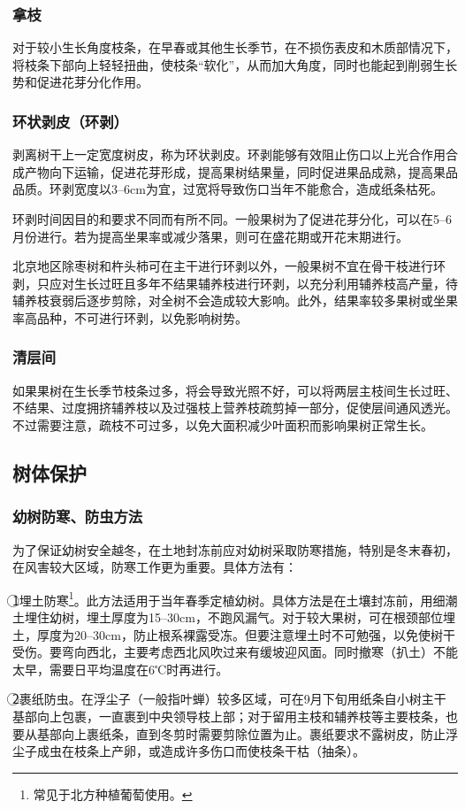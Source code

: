 \documentclass{ctexbook}
\begin{document}
\subsubsection{拿枝}
对于较小生长角度枝条，在早春或其他生长季节，在不损伤表皮和木质部情况下，将枝条下部向上轻轻扭曲，使枝条“软化”，从而加大角度，同时也能起到削弱生长势和促进花芽分化作用。
\subsubsection{环状剥皮（环剥）}
剥离树干上一定宽度树皮，称为环状剥皮。环剥能够有效阻止伤口以上光合作用合成产物向下运输，促进花芽形成，提高果树结果量，同时促进果品成熟，提高果品品质。环剥宽度以3--6cm为宜，过宽将导致伤口当年不能愈合，造成纸条枯死。

环剥时间因目的和要求不同而有所不同。一般果树为了促进花芽分化，可以在5--6月份进行。若为提高坐果率或减少落果，则可在盛花期或开花末期进行。

北京地区除枣树和杵头柿可在主干进行环剥以外，一般果树不宜在骨干枝进行环剥，只应对生长过旺且多年不结果辅养枝进行环剥，以充分利用辅养枝高产量，待辅养枝衰弱后逐步剪除，对全树不会造成较大影响。此外，结果率较多果树或坐果率高品种，不可进行环剥，以免影响树势。
\subsubsection{清层间}
如果果树在生长季节枝条过多，将会导致光照不好，可以将两层主枝间生长过旺、不结果、过度拥挤辅养枝以及过强枝上营养枝疏剪掉一部分，促使层间通风透光。不过需要注意，疏枝不可过多，以免大面积减少叶面积而影响果树正常生长。
\subsection{树体保护}
\subsubsection{幼树防寒、防虫方法}
为了保证幼树安全越冬，在土地封冻前应对幼树采取防寒措施，特别是冬末春初，在风害较大区域，防寒工作更为重要。具体方法有：

\textcircled{1}埋土防寒\footnote{常见于北方种植葡萄使用。}。此方法适用于当年春季定植幼树。具体方法是在土壤封冻前，用细潮土埋住幼树，埋土厚度为15--30cm，不跑风漏气。对于较大果树，可在根颈部位埋土，厚度为20--30cm，防止根系裸露受冻。但要注意埋土时不可勉强，以免使树干受伤。要弯向西北，主要考虑西北风吹过来有缓坡迎风面。同时撤寒（扒土）不能太早，需要日平均温度在6℃时再进行。

\textcircled{2}裹纸防虫。在浮尘子（一般指叶蝉）较多区域，可在9月下旬用纸条自小树主干基部向上包裹，一直裹到中央领导枝上部；对于留用主枝和辅养枝等主要枝条，也要从基部向上裹纸条，直到冬剪时需要剪除位置为止。裹纸要求不露树皮，防止浮尘子成虫在枝条上产卵，或造成许多伤口而使枝条干枯（抽条）。
\end{document}

